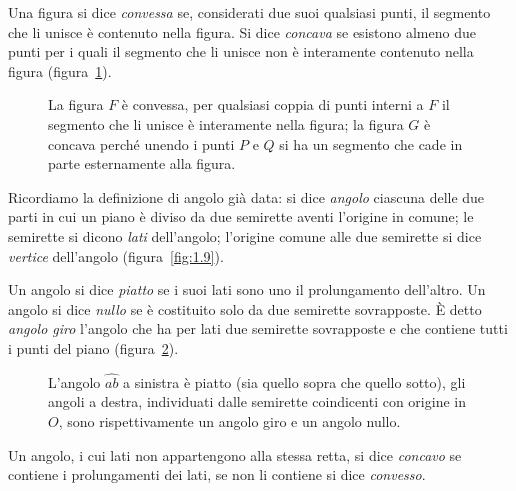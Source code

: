 \begin{definizione}
Una figura si dice \emph{convessa} se, considerati due suoi qualsiasi punti, il segmento che li unisce è contenuto nella figura. Si dice \emph{concava} se esistono almeno due punti per i quali il segmento che li unisce non è interamente contenuto nella figura (figura~\ref{fig:1.18}).
\end{definizione}
\begin{figure}[b,t,h]
 \centering 
 \caption{La figura $ F $ è convessa, per qualsiasi coppia di punti interni a $ F $ il segmento che li unisce è interamente nella figura; la figura $ G $ è concava perché unendo i punti $ P $ e $ Q $ si ha un segmento che cade in parte esternamente alla figura.}\label{fig:1.18}
\end{figure}

Ricordiamo la definizione di angolo già data: si dice \emph{angolo} ciascuna delle due parti in cui un piano è diviso da due semirette aventi l'origine in comune; le semirette si dicono \emph{lati} dell'angolo; l'origine comune alle due semirette si dice \emph{vertice} dell'angolo (figura~\ref{fig:1.9}).

\begin{definizione}
Un angolo si dice \emph{piatto} se i suoi lati sono uno il prolungamento dell'altro.
Un angolo si dice \emph{nullo} se è costituito solo da due semirette sovrapposte.
\`E detto \emph{angolo giro} l'angolo che ha per lati due semirette sovrapposte e che contiene tutti i punti del piano (figura~\ref{fig:1.19}).
\end{definizione}
\begin{figure}[bth]
 \centering 
 \caption{L'angolo  $\widehat{ab}$ a sinistra è piatto (sia quello sopra che quello sotto), gli angoli a destra, individuati dalle semirette coindicenti con origine in $O$, sono rispettivamente un angolo giro e un angolo nullo.}\label{fig:1.19}
\end{figure}

\begin{definizione}
Un angolo, i cui lati non appartengono alla stessa retta, si dice \emph{concavo} se contiene i prolungamenti dei lati, se non li contiene si dice \emph{convesso}.
\end{definizione}

\begin{figure*}[htb]
\centering  
\caption{L'angolo concavo è quello in giallo in quanto contiene i prolungamenti dei lati (punteggiati)}\label{fig:1.20}
\end{figure*}

